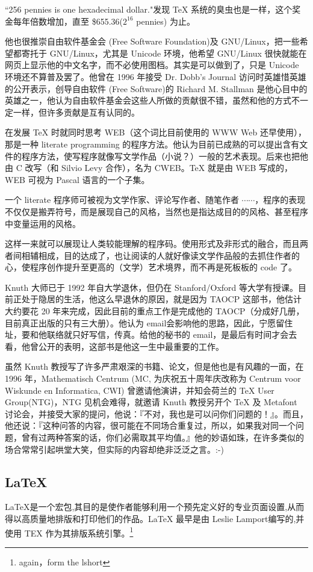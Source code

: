 ``256 pennies is one hexadecimal dollar."发现 TeX 系统的臭虫也是一样，这个奖金每年倍数增加，直至 \$655.36($ 2^{16}$ pennies) 为止。

他也很推崇自由软件基金会 (Free Software Foundation)及 GNU/Linux，把一些希望都寄托于 GNU/Linux，尤其是 Unicode 环境，他希望 GNU/Linux 很快就能在网页上显示他的中文名字，而不必使用图档。其实是可以做到了，只是 Unicode 环境还不算普及罢了。他曾在 1996 年接受 Dr. Dobb's Journal 访问时英雄惜英雄的公开表示，创导自由软件 (Free Software)的 Richard M. Stallman 是他心目中的英雄之一，他认为自由软件基金会这些人所做的贡献很不错，虽然和他的方式不一定一样，但许多贡献是互有认同的。

在发展 TeX 时就同时思考 WEB（这个词比目前使用的 WWW Web 还早使用），那是一种 literate programming 的程序方法。他认为目前已成熟的可以提出含有文件的程序方法，使写程序就像写文学作品（小说？）一般的艺术表现。后来也把他由 C 改写（和 Silvio Levy 合作），名为 CWEB。TeX 就是由 WEB 写成的，WEB 可视为 Pascal 语言的一个子集。

一个 literate 程序师可被视为文学作家、评论写作者、随笔作者 $ \cdots\cdots$，程序的表现不仅仅是搬弄符号，而是展现自己的风格，当然也是指达成目的的风格、甚至程序中变量运用的风格。

这样一来就可以展现让人类较能理解的程序码。使用形式及非形式的融合，而且两者间相辅相成，目的达成了，也让阅读的人就好像读文学作品般的去抓住作者的心，使程序创作提升至更高的（文学）艺术境界，而不再是死板板的 code 了。

Knuth 大师已于 1992 年自大学退休，但仍在 Stanford/Oxford 等大学有授课。目前正处于隐居的生活，他这么早退休的原因，就是因为 TAOCP 这部书，他估计大约要花 20 年来完成，因此目前的重点工作是完成他的 TAOCP（分成好几册，目前真正出版的只有三大册）。他认为 email会影响他的思路，因此，宁愿留住址，要和他联络就只好写信，传真。给他的秘书的 email，是最后有时间才会去看，他曾公开的表明，这部书是他这一生中最重要的工作。

虽然 Knuth 教授写了许多严肃艰深的书籍、论文，但是他也是有风趣的一面，在 1996 年，Mathematisch Centrum (MC, 为庆祝五十周年庆改称为 Centrum voor Wiskunde en Informatica, CWI) 曾邀请他演讲，并知会荷兰的 TeX User Group(NTG)，NTG 见机会难得，就邀请 Knuth 教授另开个 TeX 及 Metafont 讨论会，并接受大家的提问，他说：『不对，我也是可以问你们问题的！』。而且，他还说：『这种问答的内容，很可能在不同场合重复过，所以，如果我对同一个问题，曾有过两种答案的话，你们必需取其平均值。』他的妙语如珠，在许多类似的场合常常引起哄堂大笑，但实际的内容却绝非泛泛之言。:-)

\subsection{LaTeX}
LaTeX是一个宏包,其目的是使作者能够利用一个预先定义好的专业页面设置,从而得以高质量地排版和打印他们的作品。LaTeX 最早是由 Leslie Lamport编写的,并使用 TEX 作为其排版系统引擎。\footnote{again，form the lshort}

